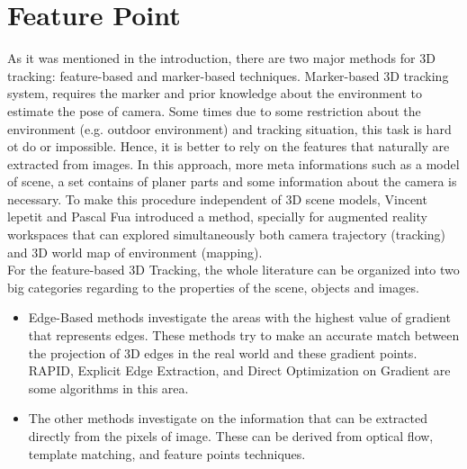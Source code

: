 \chapter{Feature Point}\label{chapter:feature_point}
As it was mentioned in the introduction, there are two major methods for 3D tracking: feature-based and marker-based techniques. Marker-based 3D tracking system, requires the marker and prior knowledge about the environment to estimate the pose of camera. Some times due to some restriction about the environment (e.g. outdoor environment) and tracking situation, this task is hard ot do or impossible. Hence, it is better to rely on the features that naturally are extracted from images. In this approach, more meta informations such as a model of scene, a set contains of planer parts and some information about the camera is necessary. To make this procedure independent of 3D scene models, Vincent lepetit and Pascal Fua \cite{lepetit2005monocular} introduced a method, specially for augmented reality workspaces that can explored simultaneously both camera trajectory (tracking) and 3D world map of environment (mapping). \\
For the feature-based 3D Tracking, the whole literature can be organized into two big categories regarding to the properties of the scene, objects and images.
\begin{itemize}
\item Edge-Based methods investigate the areas with the highest value of gradient that represents edges. These methods try to make an accurate match between the projection of 3D edges in the real world and these gradient points. RAPID, Explicit Edge Extraction, and Direct Optimization on Gradient are some algorithms in this area. 
\item The other methods investigate on the information that can be extracted directly from the pixels of image. These can be derived from optical flow, template matching, and feature points techniques.
\end{itemize}

